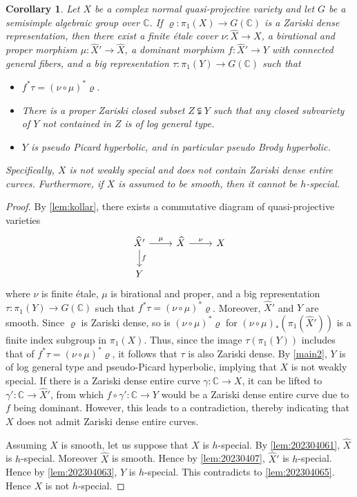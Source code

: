 \documentclass[11pt,english]{smfart}
\theoremstyle{plain}
\newtheorem{cor}[thm]{Corollary}
\theoremstyle{definition}
\theoremstyle{remark}
\numberwithin{equation}{subsection}
\theoremstyle{plain}
\newcommand{\bC}{\mathbb{C}}
\begin{document}
\begin{cor}\label{cor:202304071}	 	
 	Let $X$ be a  complex   normal quasi-projective  
	variety and let $G$ be a semisimple algebraic group over $\bC$. 
 If  $\varrho:\pi_1(X)\to G(\bC)$ is a Zariski dense representation, then there  exist
 a  finite \'etale cover \(\nu:\widehat{X}\to X\), a birational and proper morphism \(\mu:\widehat{X}'\to \widehat{X}\), a dominant morphism $f:\widehat{X}'\to Y$  with connected general fibers, and a   big   representation \(\tau : \pi_{1}(Y) \to G(\bC)\)  such that
 \begin{itemize}
 	\item   \(f^{\ast} \tau = (\nu\circ\mu)^{\ast}\varrho\). 
 	\item There is a proper Zariski closed subset $Z\subsetneqq Y$ such that any closed   subvariety of $Y$ not contained in $Z$ is  of log general type.  
 	\item  $Y$ is pseudo Picard hyperbolic, and in particular pseudo Brody hyperbolic.  
 \end{itemize}  
Specifically,   $X$ is not weakly special and does not contain Zariski dense entire curves.  Furthermore, if $X$ is assumed to be smooth, then it cannot be $h$-special.
 \end{cor}
 \begin{proof} 
 	By \cref{lem:kollar}, there exists a commutative diagram of quasi-projective varieties
 	\[
 	\begin{tikzcd}
 		\widehat{X}' \arrow[r, "\mu"] \arrow[d, "f"] & \widehat{X} \arrow[r, "\nu"] & X \\
 		Y
 	\end{tikzcd}
 	\]
 	where \(\nu\) is finite \'etale, \(\mu\) is birational and proper, and a big representation \(\tau : \pi_{1}(Y) \to G(\bC)\) such that \(f^{\ast} \tau = (\nu\circ\mu)^{\ast}\varrho\). Moreover, $\widehat{X}'$ and $Y$ are smooth. 
 	Since $\varrho$ is Zariski dense, so is $(\nu \circ \mu)^*\varrho$ for $(\nu \circ \mu)_*(\pi_1(\widehat{X}'))$ is a finite index subgroup in $\pi_1(X)$. Thus, since the image $\tau(\pi_1(Y))$ includes that of $f^*\tau=(\nu\circ\mu)^*\varrho$, it follows that $\tau$ is also Zariski dense. By \cref{main2}, $Y$ is of log general type and pseudo-Picard hyperbolic, implying that $X$ is not weakly special. If there is a Zariski dense entire curve $\gamma:\bC\to X$, it can be lifted to $\gamma':\bC\to \widehat{X}'$, from which $f\circ\gamma':\bC\to Y$ would be a Zariski dense entire curve due to $f$ being dominant. However, this leads to a contradiction, thereby indicating that $X$ does not admit Zariski dense entire curves.
 	
 	Assuming $X$ is smooth, let us suppose that $X$ is $h$-special. 
By \cref{lem:202304061}, $\widehat{X}$ is $h$-special.
Moreover $\widehat{X}$ is smooth.
Hence by \cref{lem:20230407}, $\widehat{X}'$ is $h$-special.
Hence by \cref{lem:202304063}, $Y$ is $h$-special.
This contradicts to \cref{lem:202304065}.
Hence $X$ is not $h$-special.
 \end{proof}
 
\end{document}

